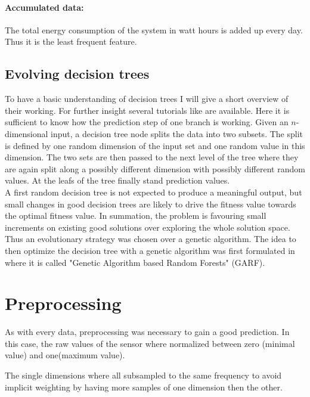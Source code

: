 \documentclass[conference]{IEEEtran}
\begin{document}
\paragraph{Accumulated data:}
The total energy consumption of the system in watt hours is added up every day. Thus it is the least frequent feature.


\subsection{Evolving decision trees}
\label{sec:GARF}

To have a basic understanding of decision trees I will give a short overview of their working. For further insight several tutorials like \cite{quinlan1986induction} are available. Here it is sufficient to know how the prediction step of one branch is working. Given an $n$-dimensional input, a decision tree node splits the data into two subsets. The split is defined by one random dimension of the input set and one random value in this dimension. The two sets are then passed to the next level of the tree where they are again split along a possibly different dimension with possibly different random values. At the leafs of the tree finally stand prediction values.\\
A first random decision tree is not expected to produce a meaningful output, but small changes in good decision trees are likely to drive the fitness value towards the optimal fitness value. In summation, the problem is favouring small increments on existing good solutions over exploring the whole solution space. Thus an evolutionary strategy was chosen over a genetic algorithm.
The idea to then optimize the decision tree with a genetic algorithm was first formulated in \cite{bader2012garf} where it is called "Genetic Algorithm based Random Forests" (GARF).


\section{Preprocessing}

As with every data, preprocessing was necessary to gain a good prediction. In this case, the raw values of the sensor where normalized between zero (minimal value) and one(maximum value).

The single dimensions where all subsampled to the same frequency to avoid implicit weighting by having more samples of one dimension then the other.
\end{document}
